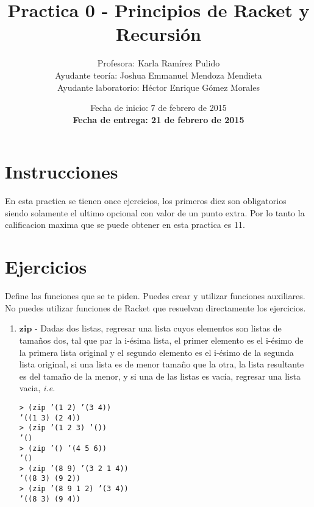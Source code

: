 \documentclass{article}
\author{Profesora: Karla Ramírez Pulido\\
  Ayudante teoría: Joshua Emmanuel Mendoza Mendieta\\
  Ayudante laboratorio: Héctor Enrique Gómez Morales}
\title{Practica 0 - Principios de Racket y Recursión}
\date{Fecha de inicio: 7 de febrero de 2015\\
  \textbf{Fecha de entrega: 21 de febrero de 2015}}
\begin{document}
\maketitle
\section{Instrucciones}
En esta practica se tienen once ejercicios, los primeros diez son
obligatorios siendo solamente el ultimo opcional con valor de un punto
extra. Por lo tanto la calificacion maxima que se puede obtener en
esta practica es 11.
\section{Ejercicios}
Define las funciones que se te piden. Puedes crear y utilizar
funciones auxiliares. No puedes utilizar funciones de Racket que
resuelvan directamente los ejercicios.
\begin{enumerate}
\item{$\textbf{zip}$ - Dadas dos listas, regresar una lista cuyos elementos son
  listas de tamaños dos, tal que par la i-ésima lista, el primer
  elemento es el i-ésimo de la primera lista original y el segundo
  elemento es el i-ésimo de la segunda lista original, si una lista es
de menor tamaño que la otra, la lista resultante es del tamaño de la
menor, y si una de las listas es vacía, regresar una lista vacia,
\textit{i.e.}}
\begin{verbatim}
> (zip ’(1 2) ’(3 4))
’((1 3) (2 4))
> (zip ’(1 2 3) ’())
’()
> (zip ’() ’(4 5 6))
’()
> (zip ’(8 9) ’(3 2 1 4))
’((8 3) (9 2))
> (zip ’(8 9 1 2) ’(3 4))
’((8 3) (9 4))
\end{verbatim}
\end{enumerate}
\end{document}
